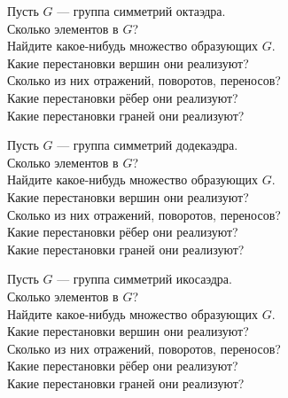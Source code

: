 \documentclass[a4paper,12pt]{article}
\begin{document}
    \problem Пусть $G$ --- группа симметрий октаэдра. \\
    \sub Сколько элементов в $G$? \\
    \sub Найдите какое-нибудь множество образующих $G$. \\
    \sub Какие перестановки вершин они реализуют? \\
    \sub Сколько из них отражений, поворотов, переносов? \\
    \sub Какие перестановки рёбер они реализуют? \\
    \sub Какие перестановки граней они реализуют?
    
    \problem Пусть $G$ --- группа симметрий додекаэдра. \\
    \sub Сколько элементов в $G$? \\
    \sub Найдите какое-нибудь множество образующих $G$. \\
    \sub Какие перестановки вершин они реализуют? \\
    \sub Сколько из них отражений, поворотов, переносов? \\
    \sub Какие перестановки рёбер они реализуют? \\
    \sub Какие перестановки граней они реализуют?
    
    \problem Пусть $G$ --- группа симметрий икосаэдра. \\
    \sub Сколько элементов в $G$? \\
    \sub Найдите какое-нибудь множество образующих $G$. \\
    \sub Какие перестановки вершин они реализуют? \\
    \sub Сколько из них отражений, поворотов, переносов? \\
    \sub Какие перестановки рёбер они реализуют? \\
    \sub Какие перестановки граней они реализуют?
    
\end{document}
